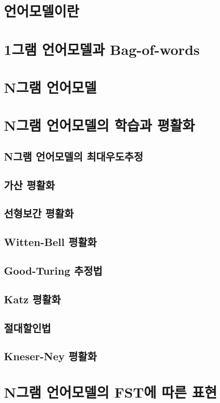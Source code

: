 \documentclass[../main.tex]{subfiles}
\begin{document}
\section{언어모델이란}

\section{1그램 언어모델과 Bag-of-words}

\section{N그램 언어모델}

\section{N그램 언어모델의 학습과 평활화}
\subsection{N그램 언어모델의 최대우도추정}
\subsection{가산 평활화}
\subsection{선형보간 평활화}
\subsection{Witten-Bell 평활화}
\subsection{Good-Turing 추정법}
\subsection{Katz 평활화}
\subsection{절대할인법}
\subsection{Kneser-Ney 평활화}

\section{N그램 언어모델의 FST에 따른 표현}\label{sec:N-gram-FST}
\end{document}
